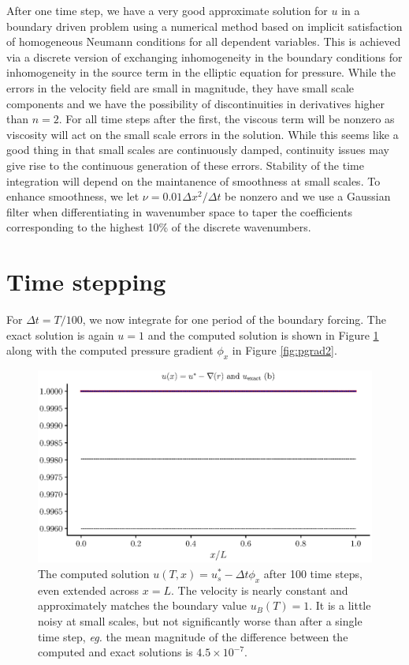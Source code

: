 \documentclass{jfm}
\begin{document}
\vspace{24pt}

After one time step, we have a very good approximate solution for $u$ in a boundary driven problem using a numerical method based on implicit satisfaction of homogeneous Neumann conditions for all dependent variables.
This is achieved via a discrete version of exchanging inhomogeneity in the boundary conditions for inhomogeneity in the source term in the elliptic equation for pressure. While the errors in the velocity field are small in magnitude, they
have small scale components and we have the possibility of discontinuities in derivatives higher than $n=2$. For all time steps after the first, the viscous term will be nonzero as viscosity will act on the small scale errors in the solution.
While this seems like a good thing in that small scales are continuously damped, continuity issues may give rise to the continuous generation of these errors. Stability of the time integration will depend on the maintanence of smoothness at
small scales. To enhance smoothness, we let $\nu=0.01 \Delta x^2/\Delta t$ be nonzero and we use a Gaussian  filter when differentiating in wavenumber space to taper the coefficients corresponding to the highest 10\% of the discrete wavenumbers.

\section{Time stepping}
For $\Delta t=T/100$, we now integrate for one period of the boundary forcing. The exact solution is again $u=1$ and the computed solution is shown in Figure \ref{fig:soln2} along with the computed pressure gradient $\phi_x$
in Figure \ref{fig:pgrad2}.

 \begin{figure}
  \centerline{\includegraphics[width=1.0\textwidth]{FIGS/explicit_100steps/pressure_correction.eps}}
  \caption{The computed solution $u(T,x)=u_s^* - \Delta t \phi_x$ after 100 time steps, even extended across $x=L$. The velocity is nearly constant and approximately matches the boundary value $u_B(T)=1$. 
  It is a little noisy at small scales, but not significantly worse than after a single time step, {\em eg.} the mean magnitude of the difference between the computed and exact solutions is  $4.5 \times 10^{-7}$.  }
  \label{fig:soln2}
\end{figure}
\end{document}
